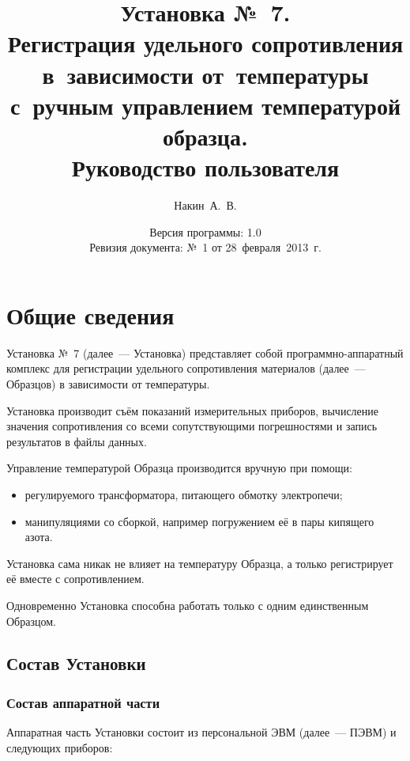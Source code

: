\documentclass[12pt, a4paper, twocolumn]{report}
\title{Установка №~7. \\ Регистрация удельного сопротивления в~зависимости от~температуры с~ручным управлением температурой образца. \\ Руководство пользователя}
\author{Накин~А.~В.}
\date{Версия программы: 1.0\\Ревизия документа: №~1 от \mbox{28 февраля 2013~г.}}
\begin{document}
\maketitle

\tableofcontents

\chapter{Общие сведения}

Установка №~7 (далее~--- Установка) представляет собой программно-аппаратный комплекс для регистрации удельного сопротивления материалов (далее~--- Образцов) в зависимости от температуры.

Установка производит съём показаний измерительных приборов, вычисление значения сопротивления со всеми сопутствующими погрешностями и запись результатов в файлы данных.

Управление температурой Образца производится вручную при помощи:

\begin{itemize}
\item регулируемого трансформатора, питающего обмотку электропечи;
\item манипуляциями со сборкой, например погружением её в пары кипящего азота.
\end{itemize}

Установка сама никак не влияет на температуру Образца, а только регистрирует её вместе с сопротивлением.

Одновременно Установка способна работать только с одним единственным Образцом.

\section{Состав Установки}

\subsection{Состав аппаратной части}

Аппаратная часть Установки состоит из персональной ЭВМ (далее~--- ПЭВМ) и следующих приборов:
\end{document}
